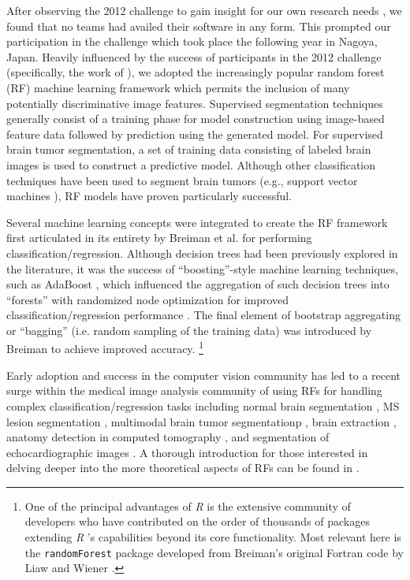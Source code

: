 \documentclass[preprint,authoryear,review,12pt]{elsarticle}
\begin{document}
After observing the 2012 challenge to gain insight for our own research 
needs \citep{durst2014}, we found that no teams had availed their software in any 
form.  This prompted our participation in the challenge which took place
the following year in Nagoya, Japan.  Heavily influenced by the success 
of participants in the 2012 challenge (specifically, the work of 
\cite{bauer2012,geremia2012,zikic2012}), we adopted the increasingly popular 
random forest (RF) machine learning framework \citep{breiman2001} which 
permits the inclusion of many potentially discriminative image features.  
Supervised segmentation techniques generally consist of a training phase
for model construction using image-based feature data followed by prediction using the 
generated model.  For supervised brain tumor segmentation, 
a set of training data consisting of labeled brain images 
is used to construct a predictive model.  Although other 
classification techniques have been used to segment
brain tumors (e.g., support vector machines \citep{bauer2011}),
RF models have proven particularly successful.

Several machine learning concepts were integrated to create 
the RF framework first articulated in its entirety by Breiman
et al. \citep{breiman2001} for performing classification/regression.  
Although decision trees had been previously explored in the literature, 
it was the success of ``boosting''-style machine learning 
techniques, such as AdaBoost \citep{schapire1990,freund1997}, which influenced 
the aggregation of such decision trees into ``forests'' 
with randomized node optimization for improved
classification/regression performance \citep{ho1995,amit1997}.
The final element of bootstrap aggregating or ``bagging'' (i.e.
random sampling of the training data) was
introduced by Breiman \citep{breiman1996} to achieve improved
accuracy.%
\footnote{
One of the principal advantages of \textit{R} is the extensive community of
developers  who have contributed on the order of thousands of packages 
extending \textit{R} 's capabilities beyond its core functionality.
Most relevant here
is the {\tt randomForest} package developed from Breiman's original
Fortran code by Liaw and Wiener \citep{liaw2002}.
}

Early adoption \cite{viola2005} and success in the
computer vision community
has led to a recent surge within the medical image analysis
community of using RFs for handling complex 
classification/regression tasks including
normal brain segmentation \citep{yi2009},
MS lesion segmentation \cite{geremia2011}, 
multimodal brain tumor segmentationp
\citep{bauer2012,zikic2012}, brain extraction \citep{iglesias2010}, 
anatomy detection in computed tomography \citep{criminisi2013}, and
segmentation of echocardiographic images \citep{verhoek2011}. 
A thorough introduction for those interested in delving deeper 
into the more theoretical aspects of RFs can be found
in \cite{criminisi2011}.
\end{document}
